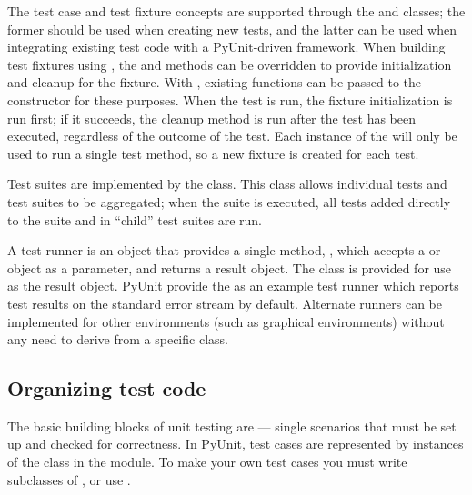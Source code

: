 The test case and test fixture concepts are supported through the
 and  classes; the former
should be used when creating new tests, and the latter can be used when
integrating existing test code with a PyUnit-driven framework.  When
building test fixtures using , the 
and  methods can be overridden to provide
initialization and cleanup for the fixture.  With
, existing functions can be passed to the
constructor for these purposes.  When the test is run, the
fixture initialization is run first; if it succeeds, the cleanup
method is run after the test has been executed, regardless of the
outcome of the test.  Each instance of the  will only
be used to run a single test method, so a new fixture is created for
each test.

Test suites are implemented by the  class.  This
class allows individual tests and test suites to be aggregated; when
the suite is executed, all tests added directly to the suite and in
``child'' test suites are run.

A test runner is an object that provides a single method,
, which accepts a  or 
object as a parameter, and returns a result object.  The class
 is provided for use as the result object.  PyUnit
provide the  as an example test runner which
reports test results on the standard error stream by default.
Alternate runners can be implemented for other environments (such as
graphical environments) without any need to derive from a specific
class.


\begin{seealso}
\end{seealso}


\subsection{Organizing test code
            \label{organizing-tests}}

The basic building blocks of unit testing are  ---
single scenarios that must be set up and checked for correctness.  In
PyUnit, test cases are represented by instances of the
 class in the  module. To make
your own test cases you must write subclasses of , or
use .

